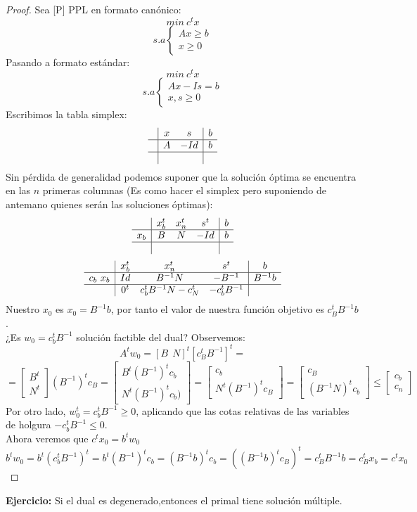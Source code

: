 \documentclass[11pt,fleqn]{book} %
\begin{document}
\begin{proof}
	Sea [P] PPL en formato canónico:
	$$
	min ~ c^t x
	$$
	$$s.a \left\{
	\begin{array}{c}
	Ax\geq b \\
	x \geq 0
	\end{array}
	\right.
	$$
	Pasando a formato estándar:
		$$
	min ~ c^t x
	$$
	$$s.a \left\{
	\begin{array}{c}
	Ax-Is=b \\
	x, s \geq 0
	\end{array}
	\right.
	$$
	Escribimos la tabla simplex:
	$$
	\begin{array}{c|cc|c}
	& x & s & b\\ \hline
	& A & - Id & b \\ \hline
	& & &
	\end{array}
	$$
	Sin pérdida de generalidad podemos suponer que la solución óptima se encuentra en las $n$ primeras columnas (Es como hacer el simplex pero suponiendo de antemano quienes serán las soluciones óptimas):
	$$
	\begin{array}{c|ccc|c}
	& x_b^t & x_n^t & s^t  & b\\ \hline
	x_b& B & N & - Id & b \\ \hline
	& & & &
	\end{array}
	$$
	$$
	\begin{array}{c|ccc|c}
	& x_b^t & x_n^t & s^t  & b\\ \hline
	c_b ~ x_b & Id &B^{-1} N & - B^{-1} &  B^{-1}b \\ \hline
	& 0^t & c_b^tB^{-1}N-c_N^t& -c_b^t B^{-1} &
	\end{array}
	$$
	Nuestro $x_0$ es $x_0=B^{-1}b$, por tanto el valor de nuestra función objetivo es $c_B^t B^{-1}b$. \\
	¿Es $w_0=c_b^t B^{-1}$ solución factible del dual? Observemos:
	$$A^tw_0=[B ~ ~N]^t[c_B^t B^{-1}]^t=$$
	$$=\left[\begin{array}{c}
		B^t \\ N^t
	\end{array}\right](B^{-1})^t c_B=\left[\begin{array}{c}
	B^t (B^{-1})^t c_b \\ N^t(B^{-1})^tc_b)
	\end{array}\right]=\left[\begin{array}{c}
	c_b \\ N^t(B^{-1})^t c_B
	\end{array}\right]=\left[\begin{array}{c}
	c_B \\ (B^{-1}N )^t c_b
	\end{array}\right] \leq \left[\begin{array}{c}
	c_b \\ c_n
	\end{array}\right]$$
	Por otro lado, $w_0^t=c_b^t B^{-1}\geq 0$, aplicando que las cotas relativas de las variables de holgura $-c_b^tB^{-1} \leq 0$. \\
	Ahora veremos que $c^tx_0=b^t w_0$
	$$b^t w_0= b^t (c_b^t B^{-1})^t=b^t (B^{-1})^t c_b=(B^{-1}b)^tc_b=((B^{-1}b)^t c_B)^t=c_B^t B^{-1}b=c_B^t x_b=c^t x_0$$
\end{proof}

\textbf{Ejercicio:} Si el dual es degenerado,entonces el primal tiene solución múltiple.
\end{document}

